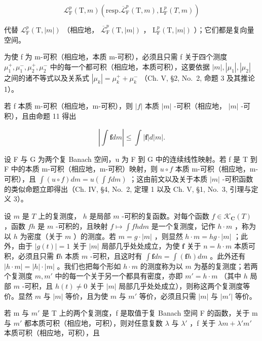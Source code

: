 \[
\mathcal {L} _ {\mathrm{F}} ^ {p} (\mathrm{T}, m) \left(\mathrm{resp.} \overline {{\mathcal {L}}} _ {\mathrm{F}} ^ {p} (\mathrm{T}, m), \mathrm{L} _ {\mathrm{F}} ^ {p} (T, m)\right)
\]

代替 \(\mathcal{L}_{\mathrm{F}}^{p}(\mathrm{T},|m|)\) （相应地， \(\overline{\mathcal{L}}_{\mathrm{F}}^{p}(\mathrm{T},|m|)\) ， \(\mathrm{L}_{\mathrm{F}}^{p}(\mathrm{T},|m|)\) ）；它们都是复向量空间。

为使 f 为 m-可积（相应地，本质 m-可积），必须且只需 f 关于四个测度 \(\mu_{1}^{+}, \mu_{1}^{-}, \mu_{2}^{+}, \mu_{2}^{-}\) 中的每一个都可积（相应地，本质可积），这要依据 \(|m|, |\mu_{1}|, |\mu_{2}|\) 之间的诸不等式以及关系式 \(|\mu_{k}| = \mu_{k}^{+} + \mu_{k}^{-}\) （Ch. V, §2, No.~2, 命题 3 及其推论 1）。

若 f 本质 m-可积（相应地，m-可积），则 \(|f|\) 本质 \(|m|\) -可积（相应地， \(|m|\) -可积），且由命题 11 得出

\[
\left| \int \mathbf {f} d m \right| \leqslant \int | \mathbf {f} | d | m |.\tag{7}
\]

设 F 与 G 为两个复 Banach 空间，u 为 F 到 G 中的连续线性映射。若 f 是 T 到 F 中的本质 m-可积（相应地，m-可积）映射，则 \(u \circ f\) 本质 m-可积（相应地，m-可积），且 \(\int(u \circ f) dm = u (\int f dm)\) ；这由前文以及关于本质 \(|m|\) -可积函数的类似命题立即得出（Ch. IV, §4, No.~2, 定理 1 以及 Ch. V, §1, No.~3, 引理与定义 3）。

设 \(m\) 是 \(T\) 上的复测度， \(h\) 是局部 \(m\) -可积的复函数。对每个函数 \(f \in \mathcal{K}_{\mathbf{C}}(T)\) ，函数 \(fh\) 是 \(m\) -可积的，且映射 \(f \mapsto \int fh dm\) 是一个复测度，记作 \(h \cdot m\) ，称为以 \(h\) 为密度（关于 \(m\) ）的测度。若 \(m = g \cdot |m|\) ，则显然 \(h \cdot m = hg \cdot |m|\) ；此外，由于 \(|g(t)| = 1\) 关于 \(|m|\) 局部几乎处处成立，为使 \(\mathbf{f}\) 关于 \(n = h \cdot m\) 本质可积，必须且只需 \(\mathbf{f}h\) 本质 \(m\) -可积，且这时有 \(\int \mathbf{f} dn = \int (\mathbf{f}h) dm\) 。此外还有 \(|h \cdot m| = |h| \cdot |m|\) 。我们也把每个形如 \(h \cdot m\) 的测度称为以 \(m\) 为基的复测度；若两个复测度 \(m, m'\) 中的每一个关于另一个都具有密度，亦即 \(m' = h \cdot m\) （其中 \(h\) 局部 \(m\) -可积，且 \(h(t) \neq 0\) 关于 \(|m|\) 局部几乎处处成立），则称这两个复测度等价。显然 \(m\) 与 \(|m|\) 等价，且为使 \(m\) 与 \(m'\) 等价，必须且只需 \(|m|\) 与 \(|m'|\) 等价。

若 m 与 \(m'\) 是 T 上的两个复测度，f 是取值于复 Banach 空间 F 的函数，关于 m 与 \(m'\) 都本质可积（相应地，可积），则对任意复数 \(\lambda\) 与 \(\lambda'\) ，f 关于 \(\lambda m + \lambda'm'\) 本质可积（相应地，可积），且

